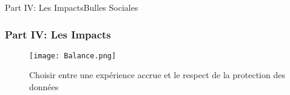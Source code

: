 \begin{frame}{Part IV: Les Impacts}{Bulles Sociales}

    \begin{figure}
        \centering
        \quad \quad \quad
    \end{figure}

\end{frame}

\begin{frame}
    \frametitle{Part IV: Les Impacts}

    \begin{figure}
        \centering
        \texttt{[image: Balance.png]}
        \caption{Choisir entre une expérience accrue et le respect de la protection des données}
    \end{figure}

\end{frame}
